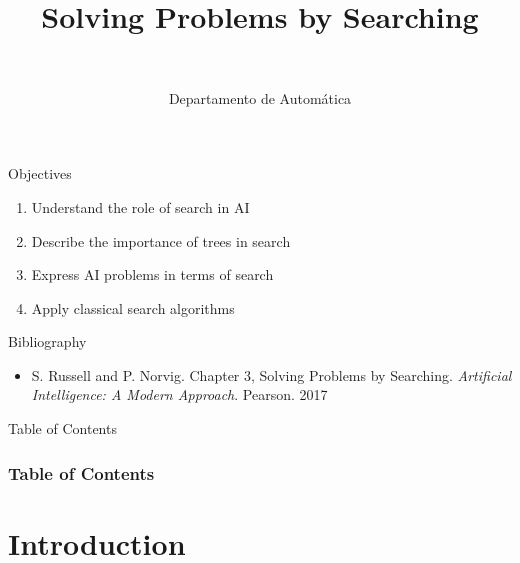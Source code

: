 \documentclass[10pt,compress]{beamer} %
\title[Search algorithm]{Solving Problems by Searching}
\author{\asignatura\\\carrera}
\institute{}
\date{Departamento de Automática}
\begin{document}
{\titlepageBlue
    \begin{frame}
        \titlepage
    \end{frame}
}

\institute{\asignatura}

\begin{frame}[plain]{}
   \begin{block}{Objectives}
      \begin{enumerate}
         \item Understand the role of search in AI
         \item Describe the importance of trees in search
         \item Express AI problems in terms of search
         \item Apply classical search algorithms
      \end{enumerate} 
   \end{block}

   \begin{block}{Bibliography}
	\begin{itemize}
        \item S. Russell and P. Norvig. Chapter 3, Solving Problems by Searching. \textit{Artificial Intelligence: A Modern Approach}. Pearson. 2017
	\end{itemize}
   \end{block}
\end{frame}

{
\begin{frame}[shrink]{Table of Contents}
 \frametitle{Table of Contents}
 \tableofcontents
\end{frame}
}

\section{Introduction}
\end{document}
